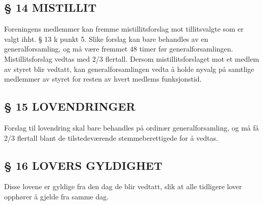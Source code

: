 \documentclass[a4paper,11pt,norsk]{scrartcl}
\begin{document}
\subsection{§ 14 MISTILLIT%
  \label{mistillit}%
}

Foreningens medlemmer kan fremme mistillitsforslag mot tillitsvalgte
som er valgt ihht. § 13 k punkt 5. Slike forslag kan bare behandles
av en generalforsamling, og må være fremmet 48 timer før
generalforsamlingen. Mistillitsforslag vedtas med 2/3 flertall. Dersom mistillitsforslaget
mot et medlem av styret blir vedtatt, kan generalforsamlingen vedta å
holde nyvalg på samtlige medlemmer av styret for resten av hvert
medlems funksjonstid.


\subsection{§ 15 LOVENDRINGER%
  \label{lovendringer}%
}

Forslag til lovendring skal bare behandles på ordinær
generalforsamling, og må få 2/3 flertall blant de tilstedeværende
stemmeberettigede for å vedtas.


\subsection{§ 16 LOVERS GYLDIGHET%
  \label{lovers-gyldighet}%
}

Disse lovene er gyldige fra den dag de blir vedtatt, slik at alle
tidligere lover opphører å gjelde fra samme dag.
\end{document}
